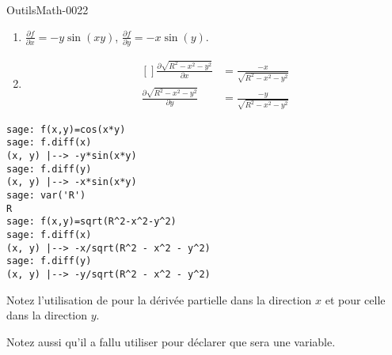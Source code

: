 
\begin{corrige}{OutilsMath-0022}

    \begin{enumerate}
        \item
            $\frac{ \partial f }{ \partial x }=-y\sin(xy)$, $\frac{ \partial f }{ \partial y }=-x\sin(y)$.
        \item
            \begin{equation}
                \begin{aligned}[]
                    \frac{ \partial \sqrt{R^2-x^2-y^2} }{ \partial x }&=\frac{ -x }{ \sqrt{R^2-x^2-y^2} }\\
                    \frac{ \partial \sqrt{R^2-x^2-y^2} }{ \partial y }&=\frac{ -y }{ \sqrt{R^2-x^2-y^2} }
                \end{aligned}
            \end{equation}
    \end{enumerate}

    \begin{verbatim}
sage: f(x,y)=cos(x*y)                                                                                                                                                                
sage: f.diff(x)
(x, y) |--> -y*sin(x*y)
sage: f.diff(y)
(x, y) |--> -x*sin(x*y)
sage: var('R')
R
sage: f(x,y)=sqrt(R^2-x^2-y^2)
sage: f.diff(x)
(x, y) |--> -x/sqrt(R^2 - x^2 - y^2)
sage: f.diff(y)
(x, y) |--> -y/sqrt(R^2 - x^2 - y^2)
    \end{verbatim}
    Notez l'utilisation de  pour la dérivée partielle dans la direction $x$ et  pour celle dans la direction $y$. 
    
    Notez aussi qu'il a fallu utiliser  pour déclarer que  sera une variable.
\end{corrige}
